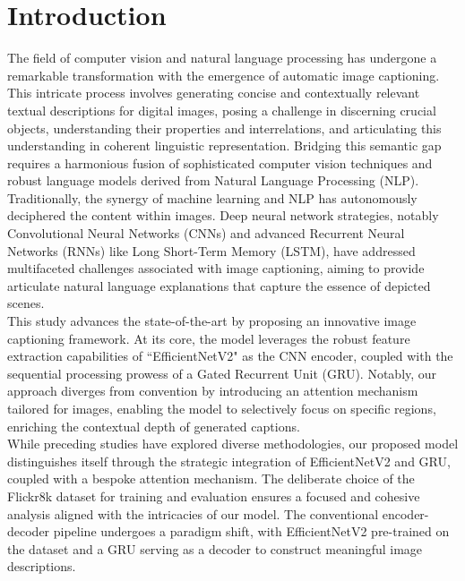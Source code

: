\documentclass[oneside,a4paper,12pt]{report}
\begin{document}
\setlength{\parindent}{11mm}
\newpage
{}

\chapter{Introduction}



The field of computer vision and natural language processing has undergone a remarkable transformation with the emergence of automatic image captioning. This intricate process involves generating concise and contextually relevant textual descriptions for digital images, posing a challenge in discerning crucial objects, understanding their properties and interrelations, and articulating this understanding in coherent linguistic representation. Bridging this semantic gap requires a harmonious fusion of sophisticated computer vision techniques and robust language models derived from Natural Language Processing (NLP).
\\
Traditionally, the synergy of machine learning and NLP has autonomously deciphered the content within images. Deep neural network strategies, notably Convolutional Neural Networks (CNNs) and advanced Recurrent Neural Networks (RNNs) like Long Short-Term Memory (LSTM), have addressed multifaceted challenges associated with image captioning, aiming to provide articulate natural language explanations that capture the essence of depicted scenes.
\\
This study advances the state-of-the-art by proposing an innovative image captioning framework. At its core, the model leverages the robust feature extraction capabilities of ``EfficientNetV2" as the CNN encoder, coupled with the sequential processing prowess of a Gated Recurrent Unit (GRU). Notably, our approach diverges from convention by introducing an attention mechanism tailored for images, enabling the model to selectively focus on specific regions, enriching the contextual depth of generated captions.
\\
While preceding studies have explored diverse methodologies, our proposed model distinguishes itself through the strategic integration of EfficientNetV2 and GRU, coupled with a bespoke attention mechanism. The deliberate choice of the Flickr8k dataset for training and evaluation ensures a focused and cohesive analysis aligned with the intricacies of our model. The conventional encoder-decoder pipeline undergoes a paradigm shift, with EfficientNetV2 pre-trained on the dataset and a GRU serving as a decoder to construct meaningful image descriptions.
\end{document}
